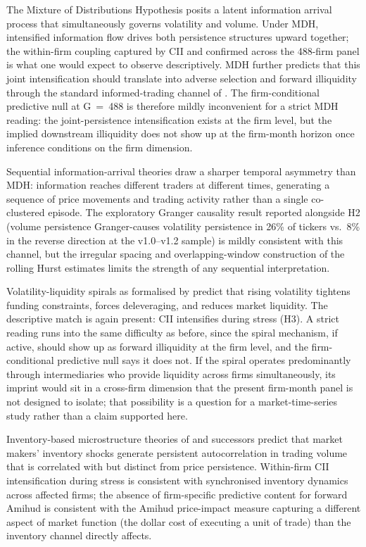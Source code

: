 \documentclass[preprint,12pt,authoryear]{elsarticle}
\begin{document}
The Mixture of Distributions Hypothesis \citep{clark1973subordinated, tauchen1983price, andersen1996return} posits a latent information arrival process that simultaneously governs volatility and volume. Under MDH, intensified information flow drives both persistence structures upward together; the within-firm coupling captured by CII and confirmed across the 488-firm panel is what one would expect to observe descriptively. MDH further predicts that this joint intensification should translate into adverse selection and forward illiquidity through the standard informed-trading channel of \citet{kyle1985continuous}. The firm-conditional predictive null at G~=~488 is therefore mildly inconvenient for a strict MDH reading: the joint-persistence intensification exists at the firm level, but the implied downstream illiquidity does not show up at the firm-month horizon once inference conditions on the firm dimension.

Sequential information-arrival theories \citep{copeland1976model} draw a sharper temporal asymmetry than MDH: information reaches different traders at different times, generating a sequence of price movements and trading activity rather than a single co-clustered episode. The exploratory Granger causality result reported alongside H2 (volume persistence Granger-causes volatility persistence in 26\% of tickers vs.\ 8\% in the reverse direction at the v1.0--v1.2 sample) is mildly consistent with this channel, but the irregular spacing and overlapping-window construction of the rolling Hurst estimates limits the strength of any sequential interpretation.

Volatility-liquidity spirals as formalised by \citet{brunnermeier2009market} predict that rising volatility tightens funding constraints, forces deleveraging, and reduces market liquidity. The descriptive match is again present: CII intensifies during stress (H3). A strict reading runs into the same difficulty as before, since the spiral mechanism, if active, should show up as forward illiquidity at the firm level, and the firm-conditional predictive null says it does not. If the spiral operates predominantly through intermediaries who provide liquidity across firms simultaneously, its imprint would sit in a cross-firm dimension that the present firm-month panel is not designed to isolate; that possibility is a question for a market-time-series study rather than a claim supported here.

Inventory-based microstructure theories of \citet{ho1981optimal} and successors predict that market makers' inventory shocks generate persistent autocorrelation in trading volume that is correlated with but distinct from price persistence. Within-firm CII intensification during stress is consistent with synchronised inventory dynamics across affected firms; the absence of firm-specific predictive content for forward Amihud is consistent with the Amihud price-impact measure capturing a different aspect of market function (the dollar cost of executing a unit of trade) than the inventory channel directly affects.
\end{document}
